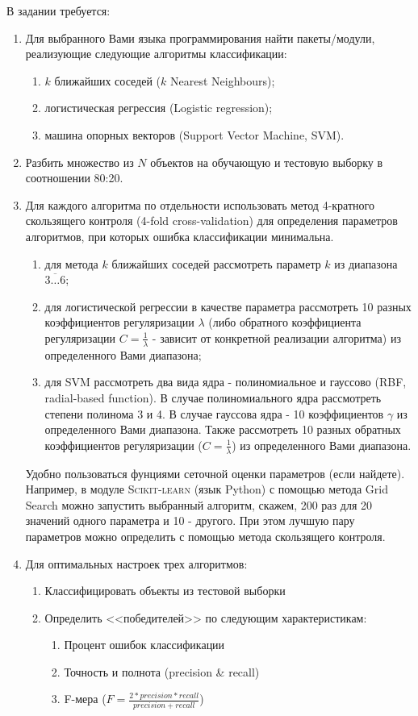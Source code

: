 \documentclass[a4paper,11pt]{article}
\begin{document}
В задании требуется:
\begin{enumerate}
  \item Для выбранного Вами языка программирования найти пакеты/модули, реализующие следующие алгоритмы классификации:
  \begin{enumerate}
    \item $k$ ближайших соседей ($k$ Nearest Neighbours);
    \item логистическая регрессия (Logistic regression);
    \item машина опорных векторов (Support Vector Machine, SVM).
  \end{enumerate}
  
  \item Разбить множество из $N$ объектов на обучающую и тестовую выборку в соотношении 80:20. 
  \item Для каждого алгоритма по отдельности использовать метод 4-кратного скользящего контроля (4-fold cross-validation) для определения параметров алгоритмов, при которых ошибка классификации минимальна. 
  \begin{enumerate}
    \item для метода $k$ ближайших соседей рассмотреть параметр $k$ из диапазона $\overline{3\dots6}$;
    \item для логистической регрессии в качестве параметра рассмотреть 10 разных коэффициентов регуляризации $\lambda$ (либо обратного коэффициента регуляризации $C = \frac{1}{\lambda}$ - зависит от конкретной реализации алгоритма) из определенного Вами диапазона;
    \item для SVM рассмотреть два вида ядра - полиномиальное и гауссово (RBF, radial-based function). В случае полиномиального ядра рассмотреть степени полинома 3 и 4. В случае гауссова ядра  - 10 коэффициентов $\gamma$ из определенного Вами диапазона. Также рассмотреть 10 разных обратных коэффициентов регуляризации ($C = \frac{1}{\lambda}$) из определенного Вами диапазона.
  \end{enumerate}
  Удобно пользоваться фунциями сеточной оценки параметров (если найдете). Например, в модуле \textsc{Scikit-learn} (язык Python) с помощью метода Grid Search можно запустить выбранный алгоритм, скажем, 200 раз для 20 значений одного параметра и 10 - другого. При этом лучшую пару параметров можно определить с помощью метода скользящего контроля.  

  \item Для оптимальных настроек трех алгоритмов:
  \begin{enumerate}
    \item Классифицировать объекты из тестовой выборки
    \item Определить <<победителей>> по следующим характеристикам:
		\begin{enumerate}
		\item Процент ошибок классификации
		\item Точность и полнота (precision \& recall)
		\item F-мера ($F = \frac{2*precision*recall}{precision+recall}$)
	  \end{enumerate}
  \end{enumerate}
\end{enumerate}
\end{document}
